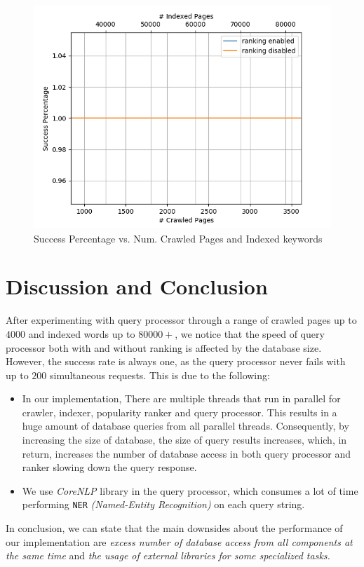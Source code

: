 \documentclass[12pt]{IEEEtran}
\begin{document}
\begin{figure}
  \centering
  \includegraphics[width=\linewidth]{secPrec.png}
  \caption{Success Percentage vs. Num. Crawled Pages and Indexed keywords}
  \label{fig:secPrec}
\end{figure}

\section{Discussion and Conclusion}
After experimenting with query processor through a range of crawled pages up to $4000$ and indexed words up to $80000+$, we notice that the speed of query processor both with and without ranking is affected by the database size. However, the success rate is always one, as the query processor never fails with up to $200$ simultaneous requests. This is due to the following:
\begin{itemize}
    \item In our implementation, There are multiple threads that run in parallel for crawler, indexer, popularity ranker and query processor. This results in a huge amount of database queries from all parallel threads. Consequently, by increasing the size of database, the size of query results increases, which, in return, increases the number of database access in both query processor and ranker slowing down the query response.
    \item We use \emph{CoreNLP} library in the query processor, which consumes a lot of time performing \texttt{NER} \emph{(Named-Entity Recognition)} on each query string.
\end{itemize}

In conclusion, we can state that the main downsides about the performance of our implementation are \emph{excess number of database access from all components at the same time} and \emph{the usage of external libraries for some specialized tasks.}
\end{document}
